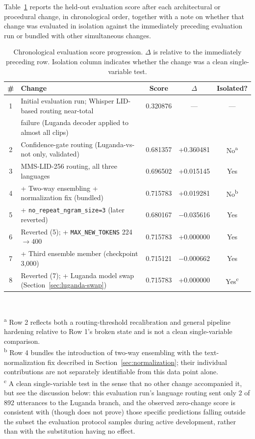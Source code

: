 \documentclass[11pt]{article}
\begin{document}
Table~\ref{tab:scores} reports the held-out evaluation score after each architectural or procedural change, in chronological order, together with a note on whether that change was evaluated in isolation against the immediately preceding evaluation run or bundled with other simultaneous changes.

\begin{table}[htbp]
\centering
\caption{Chronological evaluation score progression. $\Delta$ is relative to the immediately preceding row. Isolation column indicates whether the change was a clean single-variable test.}
\label{tab:scores}

\begin{tabular}{clccc}
\toprule
\# & Change & Score & $\Delta$ & Isolated? \\
\midrule
1 & Initial evaluation run; Whisper LID-based routing near-total & 0.320876 & --- & --- \\
  & failure (Luganda decoder applied to almost all clips) & & & \\
2 & Confidence-gate routing (Luganda-vs-not only, validated) & 0.681357 & +0.360481 & No\textsuperscript{a} \\
3 & MMS-LID-256 routing, all three languages & 0.696502 & +0.015145 & Yes \\
4 & + Two-way ensembling + normalization fix (bundled) & 0.715783 & +0.019281 & No\textsuperscript{b} \\
5 & + \texttt{no\_repeat\_ngram\_size=3} (later reverted) & 0.680167 & $-$0.035616 & Yes \\
6 & Reverted (5); + \texttt{MAX\_NEW\_TOKENS} 224$\to$400 & 0.715783 & +0.000000 & Yes \\
7 & + Third ensemble member (checkpoint 3{,}000) & 0.715121 & $-$0.000662 & Yes \\
8 & Reverted (7); + Luganda model swap (Section~\ref{sec:luganda-swap}) & 0.715783 & +0.000000 & Yes\textsuperscript{c} \\
\bottomrule
\end{tabular}
\\[4pt]
\raggedright
\textsuperscript{a} Row 2 reflects both a routing-threshold recalibration and general pipeline hardening relative to Row 1's broken state and is not a clean single-variable comparison.\\
\textsuperscript{b} Row 4 bundles the introduction of two-way ensembling with the text-normalization fix described in Section~\ref{sec:normalization}; their individual contributions are not separately identifiable from this data point alone.\\
\textsuperscript{c} A clean single-variable test in the sense that no other change accompanied it, but see the discussion below: this evaluation run's language routing sent only 2 of 892 utterances to the Luganda branch, and the observed zero-change score is consistent with (though does not prove) those specific predictions falling outside the subset the evaluation protocol samples during active development, rather than with the substitution having no effect.
\end{table}
\end{document}
